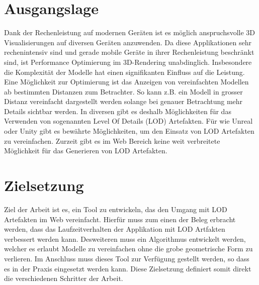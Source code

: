 \section{Ausgangslage}
Dank der Rechenleistung auf modernen Geräten ist es möglich anspruchsvolle 3D Visualisierungen auf diversen Geräten anzuwenden. Da diese Applikationen sehr rechenintensiv sind und gerade mobile Geräte in ihrer Rechenleistung beschränkt sind, ist Performance Optimierung im 3D-Rendering unabdinglich. Insbesondere die Komplexität der Modelle hat einen signifikanten Einfluss auf die Leistung.
Eine Möglichkeit zur Optimierung ist das Anzeigen von vereinfachten Modellen ab bestimmten Distanzen zum Betrachter. So kann z.B. ein Modell in grosser Distanz vereinfacht dargestellt werden solange bei genauer Betrachtung mehr Details sichtbar werden.
In diversen  gibt es deshalb Möglichkeiten für das Verwenden von sogenannten Level Of Details (LOD) Artefakten.
Für  wie Unreal oder Unity gibt es bewährte Möglichkeiten, um den Einsatz von LOD Artefakten zu vereinfachen. Zurzeit gibt es im Web Bereich keine weit verbreitete Möglichkeit für das Generieren von LOD Artefakten.

\section{Zielsetzung}
Ziel der Arbeit ist es, ein Tool zu entwickeln, das den Umgang mit LOD Artefakten im Web vereinfacht. Hierfür muss zum einen der Beleg erbracht werden, dass das Laufzeitverhalten der Applikation mit LOD Artfakten verbessert werden kann. Desweiteren muss ein Algorithmus entwickelt werden, welcher es erlaubt Modelle zu vereinfachen ohne die grobe geometrische Form zu verlieren. Im Anschluss muss dieses Tool zur Verfügung gestellt werden, so dass es in der Praxis eingesetzt werden kann. Diese Zielsetzung definiert somit direkt die verschiedenen Schritter der Arbeit.
